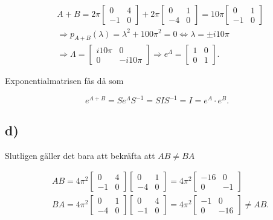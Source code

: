 \documentclass[a4paper]{article}
\newcommand{\mat}[1]{\bm{\mathit{#1}}}
\begin{document}
\begin{align*}
  &\mat{A} + \mat{B} = 2\pi\begin{bmatrix}0 & 4\\-1 & 0\end{bmatrix} + 2\pi\begin{bmatrix}0 & 1\\-4 & 0\end{bmatrix} = 10\pi\begin{bmatrix}0 & 1\\-1 & 0\end{bmatrix}\\[2ex]
  &\Rightarrow p_{A+B}(\lambda) = \lambda^2 + 100\pi^2 = 0 \iff \lambda = \pm i10\pi\\[2ex]
  &\Rightarrow \mat{\Lambda} = \begin{bmatrix}i10\pi & 0\\0 & -i10\pi\end{bmatrix} \Rightarrow e^{\mat{\Lambda}} = \begin{bmatrix}1 & 0\\0 & 1\end{bmatrix}.
\end{align*}

\noindent Exponentialmatrisen fås då som

\begin{equation*}
  e^{\mat{A}+\mat{B}} = \mat{S}e^{\mat{\Lambda}}\mat{S}^{-1} = \mat{SIS}^{-1} = \mat{I} = e^{\mat{A}}\cdot e^{\mat{B}}.
\end{equation*}

\subsection*{d)}

Slutligen gäller det bara att bekräfta att $\mat{AB} \neq \mat{BA}$

\begin{align*}
  &\mat{AB} = 4\pi^2\begin{bmatrix}0 & 4\\-1 & 0\end{bmatrix}\begin{bmatrix}0 & 1\\-4 & 0\end{bmatrix} = 4\pi^2\begin{bmatrix}-16 & 0\\0 & -1\end{bmatrix}\\[2ex]
  &\mat{BA} = 4\pi^2\begin{bmatrix}0 & 1\\-4 & 0\end{bmatrix}\begin{bmatrix}0 & 4\\-1 & 0\end{bmatrix} = 4\pi^2\begin{bmatrix}-1 & 0\\0 & -16\end{bmatrix} \neq \mat{AB}.
\end{align*}
\end{document}
